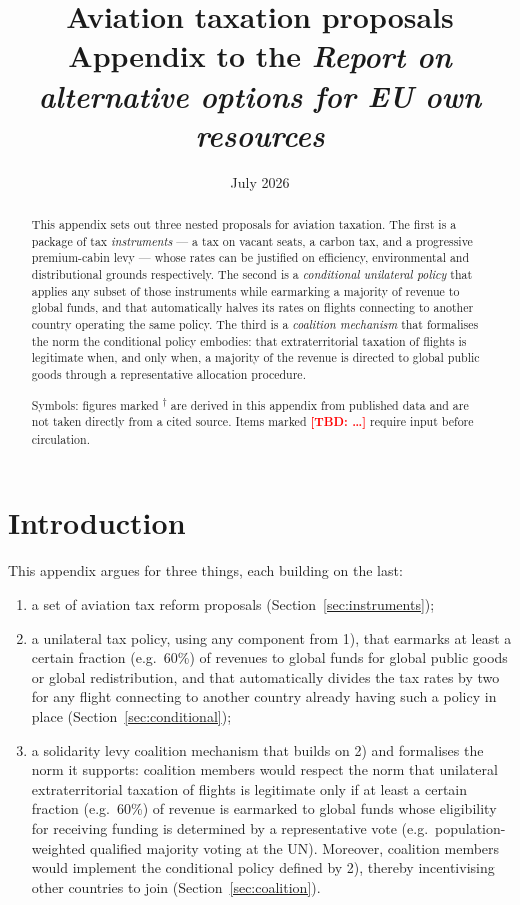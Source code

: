 \documentclass[11pt]{article}
\title{Aviation taxation proposals\\[0.4em]
\large Appendix to the \emph{Report on alternative options for EU own resources}}
\author{}
\date{July 2026}
\newcommand{\tbd}[1]{\textcolor{red}{\textbf{[TBD: #1]}}}
\newcommand{\derived}{\textsuperscript{$\dagger$}}
\begin{document}
\maketitle

\begin{abstract}
\noindent This appendix sets out three nested proposals for aviation taxation. The
first is a package of tax \emph{instruments} --- a tax on vacant seats, a carbon
tax, and a progressive premium-cabin levy --- whose rates can be justified on
efficiency, environmental and distributional grounds respectively. The second is
a \emph{conditional unilateral policy} that applies any subset of those
instruments while earmarking a majority of revenue to global funds, and that
automatically halves its rates on flights connecting to another country
operating the same policy. The third is a \emph{coalition mechanism} that
formalises the norm the conditional policy embodies: that extraterritorial
taxation of flights is legitimate when, and only when, a majority of the revenue
is directed to global public goods through a representative allocation
procedure.

\medskip
\noindent Symbols: figures marked \derived{} are derived in this appendix from
published data and are not taken directly from a cited source. Items marked
\tbd{\ldots} require input before circulation.
\end{abstract}

\tableofcontents

\section{Introduction}
\label{sec:intro}

This appendix argues for three things, each building on the last:

\begin{enumerate}[label=\arabic*)]
  \item a set of aviation tax reform proposals (Section~\ref{sec:instruments});
  \item a unilateral tax policy, using any component from 1), that earmarks at
  least a certain fraction (e.g.\ 60\%) of revenues to global funds for global
  public goods or global redistribution, and that automatically divides the tax
  rates by two for any flight connecting to another country already having such
  a policy in place (Section~\ref{sec:conditional});
  \item a solidarity levy coalition mechanism that builds on 2) and formalises
  the norm it supports: coalition members would respect the norm that unilateral
  extraterritorial taxation of flights is legitimate only if at least a certain
  fraction (e.g.\ 60\%) of revenue is earmarked to global funds whose
  eligibility for receiving funding is determined by a representative vote
  (e.g.\ population-weighted qualified majority voting at the UN). Moreover,
  coalition members would implement the conditional policy defined by 2),
  thereby incentivising other countries to join
  (Section~\ref{sec:coalition}).
\end{enumerate}
\end{document}
